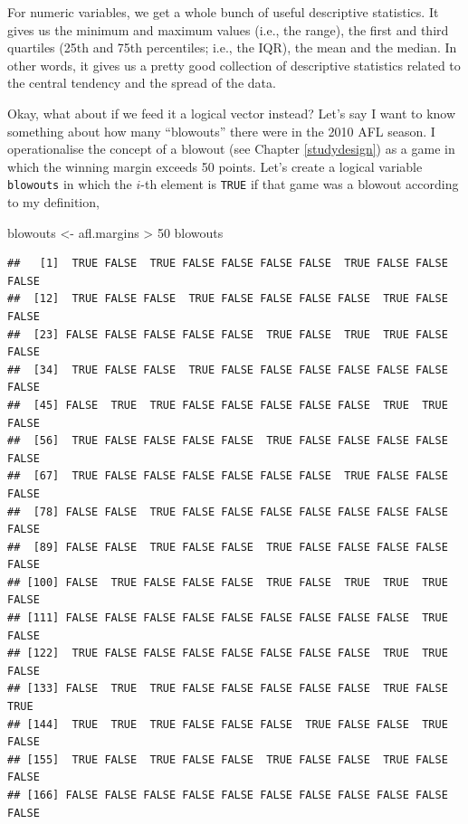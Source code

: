 \documentclass[
]{book}
\newenvironment{Shaded}{\begin{snugshade}}{\end{snugshade}}
\newcommand{\DecValTok}[1]{\textcolor[rgb]{0.00,0.00,0.81}{#1}}
\newcommand{\NormalTok}[1]{#1}
\newcommand{\OtherTok}[1]{\textcolor[rgb]{0.56,0.35,0.01}{#1}}
\newcommand{\SpecialCharTok}[1]{\textcolor[rgb]{0.00,0.00,0.00}{#1}}
\begin{document}
For numeric variables, we get a whole bunch of useful descriptive statistics. It gives us the minimum and maximum values (i.e., the range), the first and third quartiles (25th and 75th percentiles; i.e., the IQR), the mean and the median. In other words, it gives us a pretty good collection of descriptive statistics related to the central tendency and the spread of the data.

Okay, what about if we feed it a logical vector instead? Let's say I want to know something about how many ``blowouts'' there were in the 2010 AFL season. I operationalise the concept of a blowout (see Chapter \ref{studydesign}) as a game in which the winning margin exceeds 50 points. Let's create a logical variable \texttt{blowouts} in which the \(i\)-th element is \texttt{TRUE} if that game was a blowout according to my definition,

\begin{Shaded}
\begin{Highlighting}[]
\NormalTok{blowouts }\OtherTok{\textless{}{-}}\NormalTok{  afl.margins }\SpecialCharTok{\textgreater{}} \DecValTok{50}
\NormalTok{blowouts}
\end{Highlighting}
\end{Shaded}

\begin{verbatim}
##   [1]  TRUE FALSE  TRUE FALSE FALSE FALSE FALSE  TRUE FALSE FALSE FALSE
##  [12]  TRUE FALSE FALSE  TRUE FALSE FALSE FALSE FALSE  TRUE FALSE FALSE
##  [23] FALSE FALSE FALSE FALSE FALSE  TRUE FALSE  TRUE  TRUE FALSE FALSE
##  [34]  TRUE FALSE FALSE  TRUE FALSE FALSE FALSE FALSE FALSE FALSE FALSE
##  [45] FALSE  TRUE  TRUE FALSE FALSE FALSE FALSE FALSE  TRUE  TRUE FALSE
##  [56]  TRUE FALSE FALSE FALSE FALSE  TRUE FALSE FALSE FALSE FALSE FALSE
##  [67]  TRUE FALSE FALSE FALSE FALSE FALSE FALSE  TRUE FALSE FALSE FALSE
##  [78] FALSE FALSE  TRUE FALSE FALSE FALSE FALSE FALSE FALSE FALSE FALSE
##  [89] FALSE FALSE  TRUE FALSE FALSE  TRUE FALSE FALSE FALSE FALSE FALSE
## [100] FALSE  TRUE FALSE FALSE FALSE  TRUE FALSE  TRUE  TRUE  TRUE FALSE
## [111] FALSE FALSE FALSE FALSE FALSE FALSE FALSE FALSE FALSE  TRUE FALSE
## [122]  TRUE FALSE FALSE FALSE FALSE FALSE FALSE FALSE  TRUE  TRUE FALSE
## [133] FALSE  TRUE  TRUE FALSE FALSE FALSE FALSE FALSE  TRUE FALSE  TRUE
## [144]  TRUE  TRUE  TRUE FALSE FALSE FALSE  TRUE FALSE FALSE  TRUE FALSE
## [155]  TRUE FALSE  TRUE FALSE FALSE  TRUE FALSE FALSE  TRUE FALSE FALSE
## [166] FALSE FALSE FALSE FALSE FALSE FALSE FALSE FALSE FALSE FALSE FALSE
\end{verbatim}
\end{document}
